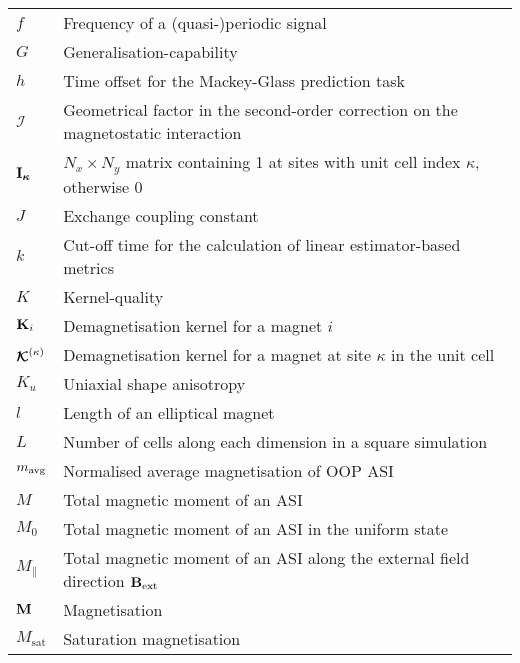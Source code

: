 \begin{longtable}[l]{p{50pt} p{295pt}}
	$f$ & Frequency of a (quasi-)periodic signal\vspace{\whiteline}\\

	$G$ & Generalisation-capability\vspace{\whiteline}\\

	$h$ & Time offset for the Mackey-Glass prediction task\vspace{\whiteline}\\

	$\mathcal{I}$ & Geometrical factor in the second-order correction on the magnetostatic interaction \\
	$\boldsymbol{\mathbf{I_\kappa}}$ & $N_x \times N_y$ matrix containing 1 at sites with unit cell index $\kappa$, otherwise 0\vspace{\whiteline}\\

	$J$ & Exchange coupling constant\vspace{\whiteline}\\

	$k$ & Cut-off time for the calculation of linear estimator-based metrics \\
	$K$ & Kernel-quality \\ %
	$\boldsymbol{\mathbf{K}}_i$ & Demagnetisation kernel for a magnet $i$ \\
	$\boldsymbol{\mathbf{\mathcal{K}}}^{(\kappa)}$ & Demagnetisation kernel for a magnet at site $\kappa$ in the unit cell \\
	$K_u$ & Uniaxial shape anisotropy\vspace{\whiteline}\\

	$l$ & Length of an elliptical magnet \\
	$L$ & Number of cells along each dimension in a square simulation\vspace{\whiteline}\\

	$m_\mathrm{avg}$ & Normalised average magnetisation of OOP ASI \\
	$M$ & Total magnetic moment of an ASI \\
	$M_0$ & Total magnetic moment of an ASI in the uniform state \\
	$M_\parallel$ & Total magnetic moment of an ASI along the external field direction $\boldsymbol{\mathbf{B}}_\mathrm{ext}$ \\
	$\boldsymbol{\mathbf{M}}$ & Magnetisation \\
	$M_\mathrm{sat}$ & Saturation magnetisation\vspace{\whiteline}\\


\end{longtable}
